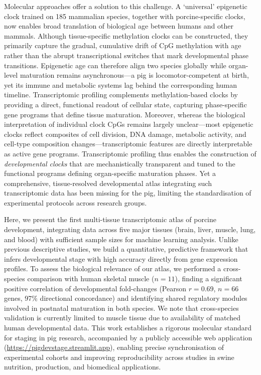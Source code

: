\documentclass[10pt,a4paper]{article}
\begin{document}
Molecular approaches offer a solution to this challenge. A `universal' epigenetic clock trained on 185 mammalian species\cite{lu_universal_2023}, together with porcine-specific clocks\cite{schachtschneider_epigenetic_2021}, now enables broad translation of biological age between humans and other mammals. Although tissue-specific methylation clocks can be constructed\cite{horvath_dna_2013,duan_epigenetic_2022,teschendorff_epigenetic_2025}, they primarily capture the gradual, cumulative drift of CpG methylation with age rather than the abrupt transcriptional switches that mark developmental phase transitions\cite{hoshino_synchrony_2019}. Epigenetic age can therefore align two species globally while organ-level maturation remains asynchronous---a pig is locomotor-competent at birth, yet its immune and metabolic systems lag behind the corresponding human timeline. Transcriptomic profiling complements methylation-based clocks by providing a direct, functional readout of cellular state, capturing phase-specific gene programs that define tissue maturation\cite{sun_spatial_2025,muralidharan_human_2025}. Moreover, whereas the biological interpretation of individual clock CpGs remains largely unclear---most epigenetic clocks reflect composites of cell division, DNA damage, metabolic activity, and cell-type composition changes\cite{teschendorff_epigenetic_2025}---transcriptomic features are directly interpretable as active gene programs. Transcriptomic profiling thus enables the construction of \textit{developmental clocks} that are mechanistically transparent and tuned to the functional programs defining organ-specific maturation phases. Yet a comprehensive, tissue-resolved developmental atlas integrating such transcriptomic data has been missing for the pig\cite{bi_ageing_clock_team_multi-tissue_2017,coorens_human_2025}, limiting the standardisation of experimental protocols across research groups.

Here, we present the first multi-tissue transcriptomic atlas of porcine development, integrating data across five major tissues (brain, liver, muscle, lung, and blood) with sufficient sample sizes for machine learning analysis. Unlike previous descriptive studies, we build a quantitative, predictive framework that infers developmental stage with high accuracy directly from gene expression profiles. To assess the biological relevance of our atlas, we performed a cross-species comparison with human skeletal muscle ($n = 11$), finding a significant positive correlation of developmental fold-changes (Pearson $r = 0.69$, $n = 66$ genes, 97\% directional concordance) and identifying shared regulatory modules involved in postnatal maturation in both species. We note that cross-species validation is currently limited to muscle tissue due to availability of matched human developmental data. This work establishes a rigorous molecular standard for staging in pig research, accompanied by a publicly accessible web application (\url{https://pigdevstage.streamlit.app}), enabling precise synchronisation of experimental cohorts and improving reproducibility across studies in swine nutrition, production, and biomedical applications.
\end{document}
